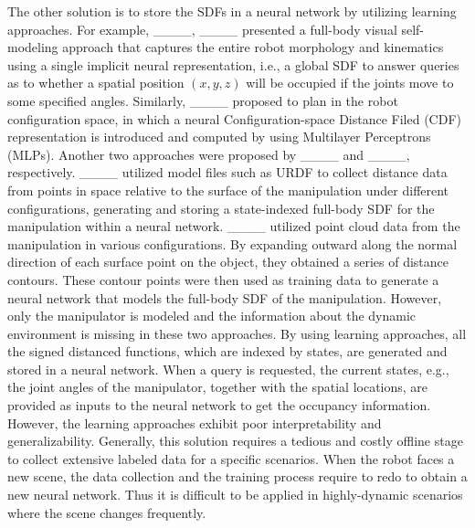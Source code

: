 The other solution is to store the SDFs in a neural network by utilizing learning approaches. For example, ____, ____ presented a full-body visual self-modeling approach that captures the entire robot morphology and kinematics using a single implicit neural representation, i.e., a global SDF to answer queries as to whether a spatial position $\left(x, y, z\right)$ will be occupied if the joints move to some specified angles. Similarly, ____ proposed to plan in the robot configuration space, in which a neural Configuration-space Distance Filed (CDF) representation is introduced and computed by using Multilayer Perceptrons (MLPs).
Another two approaches were proposed by ____ and ____, respectively. ____ utilized model files such as URDF to collect distance data from points in space relative to the surface of the manipulation under different configurations, generating and storing a state-indexed full-body SDF for the manipulation within a neural network. ____ utilized point cloud data from the manipulation in various configurations. By expanding outward along the normal direction of each surface point on the object, they obtained a series of distance contours. These contour points were then used as training data to generate a neural network that models the full-body SDF of the manipulation. However, only the manipulator is modeled and the information about the dynamic environment is missing in these two approaches.
By using learning approaches, all the signed distanced functions, which are indexed by states, are generated and stored in a neural network. When a query is requested, the current states, e.g., the joint angles of the manipulator, together with the spatial locations, are provided as inputs to the neural network to get the occupancy information.
However, the learning approaches exhibit poor interpretability and generalizability. Generally, this solution requires a tedious and costly offline stage to collect extensive labeled data for a specific scenarios. When the robot faces a new scene, the data collection and the training process require to redo to obtain a new neural network. Thus it is difficult to be applied in highly-dynamic scenarios where the scene changes frequently.